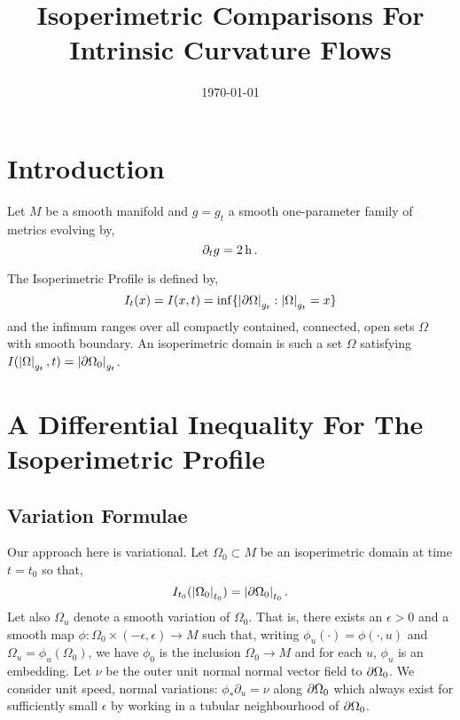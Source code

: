 \documentclass{amsart}
\title[Isoperimetric Comparison]
 {Isoperimetric Comparisons For Intrinsic Curvature Flows}
\date{\today}
\begin{document}
\begin{abstract}
\end{abstract}

\maketitle

\section{Introduction}
\label{sec:intro}

Let \(M\) be a smooth manifold and \(g = g_t\) a smooth one-parameter family of metrics evolving by,
\begin{equation}
\label{eq:dtg}
\partial_t g = 2 \operatorname{h}.
\end{equation}

The Isoperimetric Profile is defined by,
\[
I_t (x) = I(x, t) = \inf\{\left|{\partial {\Omega}}\right|_{g_t} : \left|{\Omega}\right|_{g_t} = x\}
\]
and the infimum ranges over all compactly contained, connected, open sets \(\Omega\) with smooth boundary. An isoperimetric domain is such a set \(\Omega\) satisfying \(I(\left|{\Omega}\right|_{g_t}, t) = \left|{\partial {\Omega_0}}\right|_{g_t}\).

\section{A Differential Inequality For The Isoperimetric Profile}
\label{sec:iso_diff_ineq}

\subsection{Variation Formulae}
\label{subsec:iso_diff_ineq_variation}

Our approach here is variational. Let \(\Omega_0 \subset M\) be an isoperimetric domain at time \(t = t_0\) so that,
\[
I_{t_0} (\left|{\Omega_0}\right|_{t_0}) = \left|{\partial {\Omega_0}}\right|_{t_0}.
\]
Let also \(\Omega_u\) denote a smooth variation of \(\Omega_0\). That is, there exists an \(\epsilon > 0\) and a smooth map \(\phi: \Omega_0 \times (-\epsilon, \epsilon) \to M\) such that, writing \(\phi_u(\cdot) = \phi(\cdot, u)\) and \(\Omega_u = \phi_u(\Omega_0)\), we have \(\phi_0\) is the inclusion \(\Omega_0 \to M\) and for each \(u\), \(\phi_u\) is an embedding. Let \(\nu\) be the outer unit normal normal vector field to \(\partial {\Omega_0}\). We consider unit speed, normal variations: \(\phi_{\ast} \partial_u = \nu\) along \(\partial {\Omega_0}\) which always exist for sufficiently small \(\epsilon\) by working in a tubular neighbourhood of \(\partial {\Omega_0}\).
\end{document}
